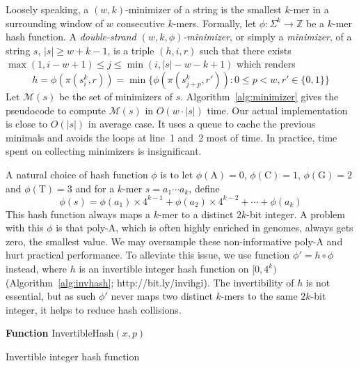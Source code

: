 \documentclass{bioinfo}
\begin{document}
\begin{methods}
Loosely speaking, a $(w,k)$-minimizer of a string is the
smallest $k$-mer in a surrounding window of $w$ consecutive $k$-mers. Formally,
let $\phi:\Sigma^k\to\mathbb{Z}$ be a $k$-mer hash function.
A \emph{double-strand $(w,k,\phi)$-minimizer}, or simply a \emph{minimizer}, of a
string $s$, $|s|\ge w+k-1$, is a triple $(h,i,r)$ such that there exists
$\max(1,i-w+1)\le j\le\min(i,|s|-w-k+1)$ which renders
$$
h=\phi(\pi(s_i^k,r))=\min\big\{\phi(\pi(s_{j+p}^k,r')):0\le p<w,r'\in\{0,1\}\big\}
$$
Let $\mathcal{M}(s)$ be the set of minimizers of $s$.  Algorithm~\ref{alg:minimizer} gives the
pseudocode to compute $\mathcal{M}(s)$ in $O(w\cdot|s|)$ time.  Our actual
implementation is close to $O(|s|)$ in average case. It uses a queue to cache
the previous minimals and avoids the loops at line~1 and~2 most of time. In
practice, time spent on collecting minimizers is insignificant.

A natural choice of hash function $\phi$ is to let $\phi(\mathrm{A})=0$,
$\phi(\mathrm{C})=1$, $\phi(\mathrm{G})=2$ and $\phi(\mathrm{T})=3$ and for a
$k$-mer $s=a_1\cdots a_k$, define
$$
\phi(s)=\phi(a_1)\times4^{k-1}+\phi(a_2)\times4^{k-2}+\cdots+\phi(a_k)
$$
This hash function always maps a $k$-mer to a distinct $2k$-bit integer. A
problem with this $\phi$ is that poly-A, which is often highly enriched in
genomes, always gets zero, the smallest value. We may oversample these
non-informative poly-A and hurt practical performance. To alleviate this issue,
we use function $\phi'=h\circ\phi$ instead, where $h$ is an invertible integer
hash function on $[0,4^k)$ (Algorithm~\ref{alg:invhash}; http://bit.ly/invihgi). The
invertibility of $h$ is not essential, but as such $\phi'$ never maps two
distinct $k$-mers to the same $2k$-bit integer, it helps to reduce hash
collisions.

\begin{algorithm}[tb]
\DontPrintSemicolon
\footnotesize
{}
\BlankLine
\textbf{Function} {\sc InvertibleHash}$(x,p)$
\caption{Invertible integer hash function}\label{alg:invhash}
\end{algorithm}


\end{methods}
\end{document}
